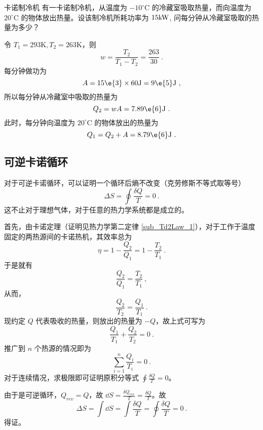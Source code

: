\begin{example}{卡诺制冷机}
有一卡诺制冷机，从温度为 $-10^{\circ} \mathrm{C}$ 的冷藏室吸取热量，而向温度为 $20^{\circ} \mathrm{C}$ 的物体放出热量。设该制冷机所耗功率为 $15\rm kW$, 问每分钟从冷藏室吸取的热量为多少？

令 $T_1 = 293 \mathrm K , T_2 = 263 \mathrm K $，则
\begin{equation}
w=\frac{T_{2}}{T_{1}-T_{2}}=\frac{263}{30}~.
\end{equation}
每分钟做功为
\begin{equation}
A=15\e{3} \times 60 \mathrm{J}=9\e{5} \mathrm{J}~,
\end{equation}
所以每分钟从冷藏室中吸取的热量为
\begin{equation}
Q_{2}=w A=7.89\e{6} \mathrm{J}~.
\end{equation}
此时，每分钟向温度为 $20^{\circ} \mathrm{C}$ 的物体放出的热量为
\begin{equation}
Q_{1}=Q_{2}+A=8.79\e{6} \mathrm{J}~.
\end{equation}

\end{example}
\subsection{可逆卡诺循环}
对于可逆卡诺循环，可以证明一个循环后熵不改变（克劳修斯不等式取等号）
\begin{equation}
\Delta S = \oint \frac{\delta Q}{T}=0~.
\end{equation} %
这不止对于理想气体，对于任意的热力学系统都是成立的。

首先，由卡诺定理（证明见热力学第二定律 \autoref{sub_Td2Law_1}），对于工作于温度固定的两热源间的卡诺热机，其效率总为
$$\eta = 1- \frac{Q_2}{Q_1} = 1-\frac{T_2}{T_1}~.$$
于是就有
$$\frac{Q_2}{Q_1} = \frac{T_2}{T_1} ~,$$
从而，
$$\frac{Q_2}{T_2} = \frac{Q_1}{T_1} ~.$$
现约定 $Q$ 代表吸收的热量，则放出的热量为 $-Q$，故上式可写为
\begin{equation}
\frac{Q_1}{T_1} + \frac{Q_2}{T_2} = 0~.
\end{equation}
推广到 $n$ 个热源的情况即为
\begin{equation}
\sum_{i=1}^{n} \frac{Q_i}{T_i} = 0 ~.
\end{equation}
对于连续情况，求极限即可证明原积分等式 $\oint \frac{\delta Q}{T} = 0$。

由于是可逆循环，$Q_{rev} = Q$，故 $\dd S = \frac{\delta Q_{rev}}{T} = \frac{\delta Q}{T}$。故
\begin{equation}
\Delta S = \int \dd S = \int {\frac{\delta Q}{T}} = \oint {\frac {\delta Q}{T}} = 0~.
\end{equation}
得证。
